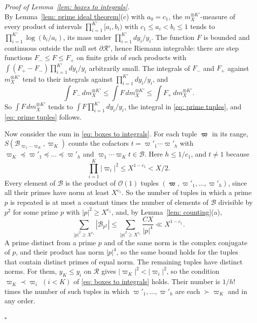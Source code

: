\documentclass{article}
\numberwithin{equation}{section}
\newenvironment{proof}[1][Proof]{\par\medskip\noindent\textit{#1.}\ }{\hfill$\square$\par\medskip}
\newcommand{\Le}{\leqslant}
\newcommand{\Ge}{\geqslant}
\begin{document}
\begin{proof}[Proof of Lemma~\ref{lem: boxes to integrals}]
\begin{equation*}
\end{equation*} By Lemma~\ref{lem: prime ideal theorem}(c) with $a_0 = c_1$, the $m_X^{\otimes K'}$-measure of every product of intervals $\prod_{i=1}^{K'} [a_i, b_i)$ with $c_1 \Le a_i < b_i \Le 1$ tends to $\prod_{i=1}^{K'} \log(b_i/a_i)$, its mass under $\prod_{i=1}^{K'} dy_i/y_i$. The function $F$ is bounded and continuous outside the null set $\partial\mathcal{R}'$, hence Riemann integrable: there are step functions $F_- \Le F \Le F_+$ on finite grids of such products with $\int (F_+ - F_-) \prod_{i=1}^{K'} dy_i/y_i$ arbitrarily small. The integrals of $F_-$ and $F_+$ against $m_X^{\otimes K'}$ tend to their integrals against $\prod_{i=1}^{K'} dy_i/y_i$, and
\begin{equation*}
\int F_-\, dm_X^{\otimes K'} \Le \int F\, dm_X^{\otimes K'} \Le \int F_+\, dm_X^{\otimes K'}.
\end{equation*} So $\int F\, dm_X^{\otimes K'}$ tends to $\int F \prod_{i=1}^{K'} dy_i/y_i$, the integral in \eqref{eq: prime tuples}, and \eqref{eq: prime tuples} follows.

Now consider the sum in \eqref{eq: boxes to integrals}. For each tuple $\boldsymbol{\varpi}$ in its range, $S(\mathcal{B}_{\varpi_1 \cdots \varpi_K}, \varpi_K)$ counts the cofactors $t = \varpi'_1 \cdots \varpi'_h$ with $\varpi_K \preccurlyeq \varpi'_1 \preccurlyeq \dots \preccurlyeq \varpi'_h$ and $\varpi_1 \cdots \varpi_K t \in \mathcal{B}$. Here $h \Le 1/c_1$, and $t \neq 1$ because
\begin{equation*}
\prod_{i=1}^{K} |\varpi_i|^2 \Le X^{1 - c_1} < X/2.
\end{equation*} Every element of $\mathcal{B}$ is the product of $\mathcal{O}(1)$ tuples $(\boldsymbol{\varpi}, \varpi'_1, \dots, \varpi'_h)$, since all their primes have norm at least $X^{c_1}$. So the number of tuples in which a prime $p$ is repeated is at most a constant times the number of elements of $\mathcal{B}$ divisible by $p^2$ for some prime $p$ with $|p|^2 \Ge X^{c_1}$, and, by Lemma~\ref{lem: counting}(a),
\begin{equation*}
\sum_{|p|^2 \Ge X^{c_1}} |\mathcal{B}_{p^2}| \Le \sum_{|p|^2 \Ge X^{c_1}} \frac{CX}{|p|^4} \ll X^{1 - c_1}.
\end{equation*} A prime distinct from a prime $p$ and of the same norm is the complex conjugate of $p$, and their product has norm $|p|^4$, so the same bound holds for the tuples that contain distinct primes of equal norm. The remaining tuples have distinct norms. For them, $y_K \Le y_i$ on $\mathcal{R}$ gives $|\varpi_K|^2 < |\varpi_i|^2$, so the condition $\varpi_K \prec \varpi_i$ $(i < K)$ of \eqref{eq: boxes to integrals} holds. Their number is $1/h!$ times the number of such tuples in which $\varpi'_1, \dots, \varpi'_h$ are each $\succ \varpi_K$ and in any order.


\end{proof}
\end{document}
